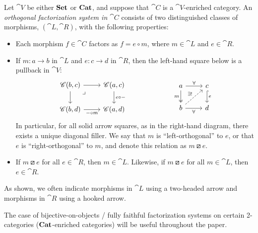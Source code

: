 \documentclass[11pt,oneside,article]{memoir}
\begin{document}
\begin{definition}\label{def:orthogonal}
   Let $\cat{V}$ be either $\mathbf{Set}$ or $\mathbf{Cat}$, and suppose that $\cat{C}$ is a $\cat{V}$-enriched
   category. An \emph{orthogonal factorization system in $\cat{C}$} consists of two distinguished
   classes of morphisms, $(\cat{L},\cat{R})$, with the following properties:
   \begin{itemize}
      \item Each morphism $f\in\cat{C}$ factors as $f=e\circ m$, where $m\in\cat{L}$ and
         $e\in\cat{R}$.
      \item If $m\colon a\to b$ in $\cat{L}$ and $e\colon c\to d$ in $\cat{R}$, then the left-hand
         square below is a pullback in $\cat{V}$:
         \begin{equation}\label{eqn:OrthFactSys}
            \begin{tikzcd}
               \cat{C}(b,c)\ar[r]\ar[d]\ar[rd,phantom,"\lrcorner" very near start]&\cat{C}(a,c)\ar[d,"e\circ -"]\\
               \cat{C}(b,d)\ar[r,"-\circ m"']&\cat{C}(a,d)
            \end{tikzcd}
            \hspace{.9in}
            \begin{tikzcd}
               a\ar[r,"\forall"]\ar[d,two heads,"m"']&c\ar[d,hook, "e"]\\
               b\ar[r,"\forall"']\ar[ur,dashed,"\exists!"]&d
            \end{tikzcd}
         \end{equation}
         In particular, for all solid arrow squares, as in the right-hand diagram, there exists a
         unique diagonal filler. We say that $m$ is ``left-orthogonal'' to $e$, or that $e$ is
         ``right-orthogonal'' to $m$, and denote this relation as $m\boxslash e$.
      \item If $m\boxslash e$ for all $e\in\cat{R}$, then $m\in\cat{L}$. Likewise, if $m\boxslash e$
         for all $m\in\cat{L}$, then $e\in\cat{R}$.
   \end{itemize}
   As shown, we often indicate morphisms in $\cat{L}$ using a two-headed arrow and morphisms in
   $\cat{R}$ using a hooked arrow.
\end{definition}

The case of bijective-on-objects / fully faithful factorization systems on certain 2-categories ($\mathbf{Cat}$-enriched categories) will be useful throughout the paper. 
\end{document}
